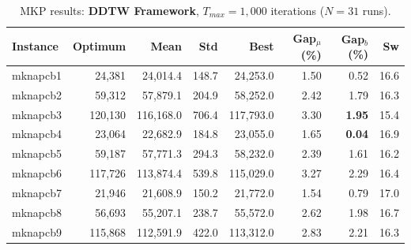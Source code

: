 \documentclass[review]{elsarticle}
\begin{document}
\begin{table}[htbp]
\centering
\caption{MKP results: \textbf{DDTW Framework}, $T_{max} = 1{,}000$ iterations ($N=31$ runs).}
\label{tab:mkp_ddtw_1k}
\begin{tabular}{lrrrrrrr}
\toprule
\textbf{Instance} & \textbf{Optimum} & \textbf{Mean} & \textbf{Std} & \textbf{Best} & \textbf{Gap$_\mu$ (\%)} & \textbf{Gap$_b$ (\%)} & \textbf{Sw} \\
\midrule
mknapcb1 & 24,381 & 24,014.4 & 148.7 & 24,253.0 & 1.50 & 0.52 & 16.6 \\
mknapcb2 & 59,312 & 57,879.1 & 204.9 & 58,252.0 & 2.42 & 1.79 & 16.3 \\
mknapcb3 & 120,130 & 116,168.0 & 706.4 & 117,793.0 & 3.30 & \textbf{1.95} & 15.4 \\
mknapcb4 & 23,064 & 22,682.9 & 184.8 & 23,055.0 & 1.65 & \textbf{0.04} & 16.9 \\
mknapcb5 & 59,187 & 57,771.3 & 294.3 & 58,232.0 & 2.39 & 1.61 & 16.2 \\
mknapcb6 & 117,726 & 113,874.4 & 539.8 & 115,029.0 & 3.27 & 2.29 & 16.4 \\
mknapcb7 & 21,946 & 21,608.9 & 150.2 & 21,772.0 & 1.54 & 0.79 & 17.0 \\
mknapcb8 & 56,693 & 55,207.1 & 238.7 & 55,572.0 & 2.62 & 1.98 & 16.7 \\
mknapcb9 & 115,868 & 112,591.9 & 422.0 & 113,312.0 & 2.83 & 2.21 & 16.3 \\
\bottomrule
\end{tabular}
\end{table}
\end{document}
